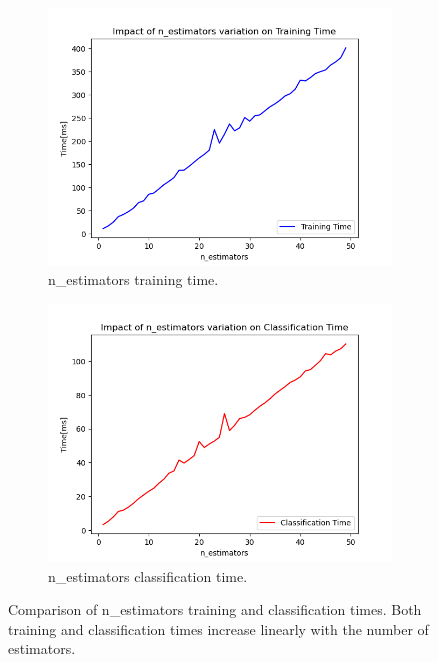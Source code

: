 \documentclass[futureinternet,article,submit,pdftex,moreauthors]{Definitions/mdpi}
\begin{document}
\begin{figure}[H]
    \centering
    \begin{subfigure}{0.49\textwidth}
        \centering
        \includegraphics[width=\textwidth]{img/nEstimatorsTrainingTime.png}
        \caption{n\_estimators training time.}
        \label{fig:n_estimators_training_time}
    \end{subfigure}
    \hfill
    \begin{subfigure}{0.49\textwidth}
        \centering
        \includegraphics[width=\textwidth]{img/nEstimatorsClassificationTime.png}
        \caption{n\_estimators classification time.}
        \label{fig:n_estimators_classification_time}
    \end{subfigure}
    \caption{Comparison of n\_estimators training and classification times. Both training and classification times increase linearly with the number of estimators.}
    \label{fig:estimators_time_comparison}
\end{figure}
\end{document}
